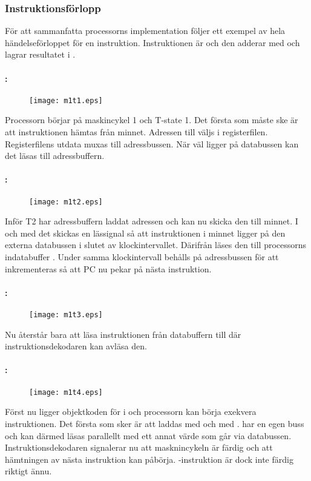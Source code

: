 \documentclass[main.tex]{subfiles}
\newcommand{\diagw}{0.7\textwidth}
\begin{document}
\subsubsection{Instruktionsförlopp}
För att sammanfatta processorns implementation följer ett exempel av hela
händelseförloppet för en instruktion. Instruktionen är  och den adderar
 med  och lagrar resultatet i .

\paragraph{: }
\begin{figure}[H]
    \center
    \texttt{[image: m1t1.eps]}
\end{figure}
Processorn börjar på maskincykel 1 och T-state 1. Det första som måste ske är
att instruktionen hämtas från minnet. Adressen till  väljs i
registerfilen. Registerfilens utdata muxas till adressbussen.  När 
väl ligger på databussen kan det läsas till adressbuffern.

\paragraph{: }
\begin{figure}[H]
    \center
    \texttt{[image: m1t2.eps]}
\end{figure}
Inför T2 har adressbuffern laddat adressen och kan nu skicka den till minnet. I
och med det skickas en lässignal så att instruktionen i minnet ligger på den
externa databussen i slutet av klockintervallet. Därifrån läses den till
processorns indatabuffer . Under samma klockintervall behålls
 på adressbussen för att inkrementeras så att PC nu pekar på nästa
instruktion.

\paragraph{: }
\begin{figure}[H]
    \center
    \texttt{[image: m1t3.eps]}
\end{figure}
Nu återstår bara att läsa instruktionen från databuffern till  där
instruktionsdekodaren kan avläsa den.

\paragraph{: }
\begin{figure}[H]
    \center
    \texttt{[image: m1t4.eps]}
\end{figure}
Först nu ligger objektkoden för  i  och processorn kan
börja exekvera instruktionen. Det första som sker är att  laddas med
 och  med .  har en egen buss och kan därmed
läsas parallellt med ett annat värde som går via databussen.
Instruktionsdekodaren signalerar nu att masknincykeln är färdig och att
hämtningen av nästa instruktion kan påbörja. -instruktion är dock
inte färdig riktigt ännu.
\end{document}
